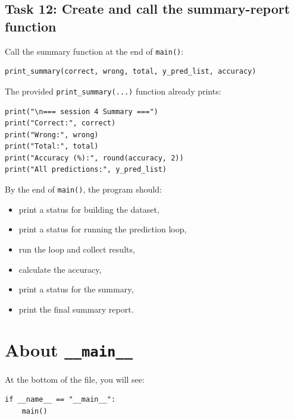 \subsection{Task 12: Create and call the summary-report function}

\begin{tcolorbox}[title=Task 12: Create and call the summary-report function]
Call the summary function at the end of \texttt{main()}:
\end{tcolorbox}

\begin{verbatim}
print_summary(correct, wrong, total, y_pred_list, accuracy)
\end{verbatim}

The provided \texttt{print\_summary(...)} function already prints:
\begin{verbatim}
print("\n=== session 4 Summary ===")
print("Correct:", correct)
print("Wrong:", wrong)
print("Total:", total)
print("Accuracy (%):", round(accuracy, 2))
print("All predictions:", y_pred_list)
\end{verbatim}

\begin{tcolorbox}[title=Checkpoint]
By the end of \texttt{main()}, the program should:
\begin{itemize}
    \item print a status for building the dataset,
    \item print a status for running the prediction loop,
    \item run the loop and collect results,
    \item calculate the accuracy,
    \item print a status for the summary,
    \item print the final summary report.
\end{itemize}
\end{tcolorbox}

\section{About \texttt{\_\_main\_\_}}
At the bottom of the file, you will see:

\begin{verbatim}
if __name__ == "__main__":
    main()
\end{verbatim}

